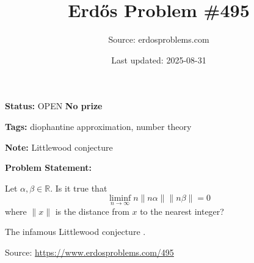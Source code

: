 \documentclass{article}
\title{Erd\H{o}s Problem \#495}
\date{Last updated: 2025-08-31}
\author{Source: erdosproblems.com}
\begin{document}
\maketitle

\noindent\textbf{Status:} OPEN \quad \textbf{No prize}

\noindent\textbf{Tags:} diophantine approximation, number theory

\medskip
\noindent\textbf{Note:} Littlewood conjecture

\medskip

\noindent\textbf{Problem Statement:}

Let $\alpha,\beta \in \mathbb{R}$. Is it true that\[\liminf_{n\to \infty} n \| n\alpha \| \| n\beta\| =0\]where $\|x\|$ is the distance from $x$ to the nearest integer?




The infamous Littlewood conjecture .


\bigskip
\noindent\small{Source: \url{https://www.erdosproblems.com/495}}
\end{document}
